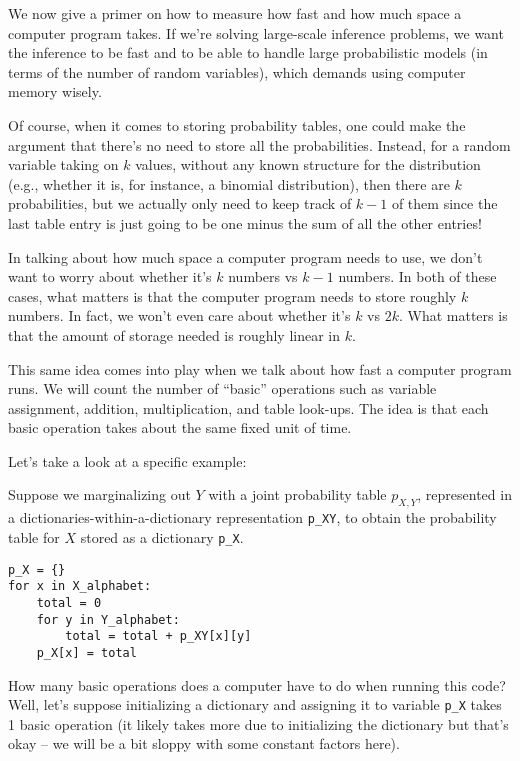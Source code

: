 \documentclass[6008notes.tex]{subfiles}
\begin{document}
We now give a primer on how to measure how fast and how much space a computer program takes. If we're solving large-scale inference problems, we want the inference to be fast and to be able to handle large probabilistic models (in terms of the number of random variables), which demands using computer memory wisely.

Of course, when it comes to storing probability tables, one could make the argument that there's no need to store all the probabilities. Instead, for a random variable taking on $k$ values, without any known structure for the distribution (e.g., whether it is, for instance, a binomial distribution), then there are $k$ probabilities, but we actually only need to keep track of $k-1$ of them since the last table entry is just going to be one minus the sum of all the other entries!

In talking about how much space a computer program needs to use, we don't want to worry about whether it's $k$ numbers vs $k-1$ numbers. In both of these cases, what matters is that the computer program needs to store roughly $k$ numbers. In fact, we won't even care about whether it's $k$ vs $2k$. What matters is that the amount of storage needed is roughly linear in $k$.

This same idea comes into play when we talk about how fast a computer program runs. We will count the number of ``basic'' operations such as variable assignment, addition, multiplication, and table look-ups. The idea is that each basic operation takes about the same fixed unit of time.

Let's take a look at a specific example:

Suppose we marginalizing out $Y$ with a joint probability table $p_{X,Y}$, represented in a dictionaries-within-a-dictionary representation \lstinline{p_XY}, to obtain the probability table for $X$ stored as a dictionary \lstinline{p_X}.

\begin{lstlisting}
p_X = {}
for x in X_alphabet:
    total = 0
    for y in Y_alphabet:
        total = total + p_XY[x][y]
    p_X[x] = total
\end{lstlisting}
		
How many basic operations does a computer have to do when running this code? Well, let's suppose initializing a dictionary and assigning it to variable \lstinline{p_X} takes 1 basic operation (it likely takes more due to initializing the dictionary but that's okay -- we will be a bit sloppy with some constant factors here).
\end{document}
